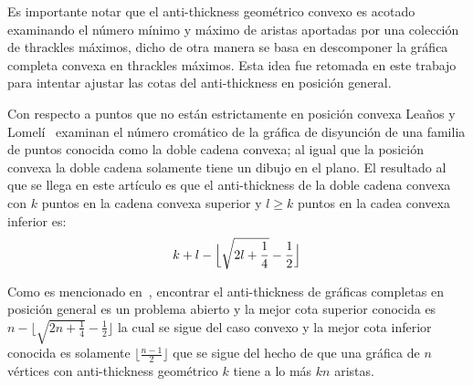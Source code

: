Es importante notar que el anti-thickness geométrico convexo es acotado examinando el número mínimo
y máximo de aristas aportadas por una colección de thrackles máximos, dicho de
otra manera se basa en descomponer la gráfica completa convexa en thrackles máximos.
Esta idea fue retomada en este trabajo para intentar ajustar las cotas del anti-thickness
en posición general.

Con respecto a puntos que no están estrictamente en posición convexa Leaños y Lomelí~\cite{Lomeli2018}
examinan el número cromático de la gráfica de disyunción de una familia de puntos
conocida como la doble cadena convexa; al igual que la posición convexa la doble cadena
solamente tiene un dibujo en el plano. El resultado al que se llega en este artículo es que
el anti-thickness de la doble cadena convexa con $k$ puntos en la cadena convexa superior
y $l \geq k$ puntos en la cadea convexa inferior es:
 \[k+l-\Bigl\lfloor \sqrt{2l+\frac{1}{4}} - \frac{1}{2} \Bigr\rfloor\]

 Como es mencionado en~\cite{Dujmovic2017}, encontrar el anti-thickness de gráficas
 completas en posición general es un problema abierto y la mejor cota superior
 conocida es $ n - \lfloor \sqrt{2n + \frac{1}{4}} - \frac{1}{2} \rfloor $
la cual se sigue del caso convexo y la mejor cota inferior conocida es solamente
$\lfloor\frac{n-1}{2}\rfloor$ que se sigue del hecho de que una gráfica de $n$ vértices
con anti-thickness geométrico $k$ tiene a lo más $kn$ aristas.
